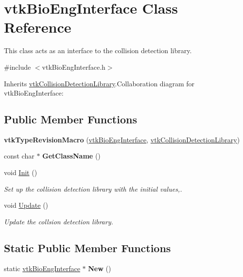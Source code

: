 \hypertarget{classvtkBioEngInterface}{
\section{vtkBioEngInterface Class Reference}
\label{classvtkBioEngInterface}
}


This class acts as an interface to the collision detection library.  


{\ttfamily \#include $<$vtkBioEngInterface.h$>$}

Inherits \hyperlink{classvtkCollisionDetectionLibrary}{vtkCollisionDetectionLibrary}.Collaboration diagram for vtkBioEngInterface:\subsection*{Public Member Functions}
\begin{DoxyCompactItemize}
\item 
\hypertarget{classvtkBioEngInterface_afe62020c4d9112e40fdc089297defa5e}{
{\bfseries vtkTypeRevisionMacro} (\hyperlink{classvtkBioEngInterface}{vtkBioEngInterface}, \hyperlink{classvtkCollisionDetectionLibrary}{vtkCollisionDetectionLibrary})}
\label{classvtkBioEngInterface_afe62020c4d9112e40fdc089297defa5e}

\item 
\hypertarget{classvtkBioEngInterface_a42df0bc0bdc717fb6c6eb187ac61523a}{
const char $\ast$ {\bfseries GetClassName} ()}
\label{classvtkBioEngInterface_a42df0bc0bdc717fb6c6eb187ac61523a}

\item 
void \hyperlink{classvtkBioEngInterface_a52f71a20ab8e16bbeb357642975a5b67}{Init} ()
\begin{DoxyCompactList}\small\item\em Set up the collision detection library with the initial values,. \item\end{DoxyCompactList}\item 
void \hyperlink{classvtkBioEngInterface_af04a067b7a6f524faa7ff14552147260}{Update} ()
\begin{DoxyCompactList}\small\item\em Update the collsion detection library. \item\end{DoxyCompactList}\end{DoxyCompactItemize}
\subsection*{Static Public Member Functions}
\begin{DoxyCompactItemize}
\item 
\hypertarget{classvtkBioEngInterface_ab0bafffd48213a95c2fdc51261cd404e}{
static \hyperlink{classvtkBioEngInterface}{vtkBioEngInterface} $\ast$ {\bfseries New} ()}
\label{classvtkBioEngInterface_ab0bafffd48213a95c2fdc51261cd404e}

\end{DoxyCompactItemize}
